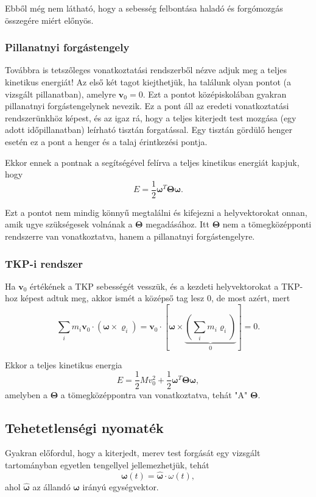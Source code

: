 \documentclass[12pt,a4paper]{scrartcl}
\let\mathbf\bm
\begin{document}
Ebből még nem látható, hogy a sebesség felbontása haladó és forgómozgás összegére miért előnyös.
\subsubsection{Pillanatnyi forgástengely}
Továbbra is tetszőleges vonatkoztatási rendszerből nézve adjuk meg a teljes kinetikus energiát! Az első két tagot kiejthetjük, ha találunk olyan pontot (a vizsgált pillanatban), amelyre ${{\mathbf{v}}_0} = 0$. Ezt a pontot középiskolában gyakran pillanatnyi forgástengelynek nevezik. Ez a pont áll az eredeti vonatkoztatási rendszerünkhöz képest, és az igaz rá, hogy a teljes kiterjedt test mozgása (egy adott időpillanatban) leírható tisztán forgatással. Egy tisztán gördülő henger esetén ez a pont a henger és a talaj érintkezési pontja.

Ekkor ennek a pontnak a segítségével felírva a teljes kinetikus energiát kapjuk, hogy
\[E = \frac{1}{2}{{\mathbf{\omega }}^T}{\mathbf{\Theta \omega }}.\]

Ezt a pontot nem mindig könnyű megtalálni és kifejezni a helyvektorokat onnan, amik ugye szükségesek volnának a ${\mathbf{\Theta }}$ megadásához. Itt ${\mathbf{\Theta }}$ nem a tömegközépponti rendszerre van vonatkoztatva, hanem a pillanatnyi forgástengelyre.

\subsubsection{TKP-i rendszer}
Ha ${{\mathbf{v}}_0}$ értékének a TKP sebességét vesszük, és a kezdeti helyvektorokat a TKP-hoz képest adtuk meg, akkor ismét a középső tag lesz 0, de most azért, mert
\[\sum\limits_i {{m_i}{{\mathbf{v}}_0} \cdot \left( {{\mathbf{\omega }} \times {{\mathbf{\varrho }}_i}} \right)}  = {{\mathbf{v}}_0} \cdot \left[ {{\mathbf{\omega }} \times \underbrace {\left( {\sum\limits_i {{m_i}{{\mathbf{\varrho }}_i}} } \right)}_0} \right] = 0.\]

Ekkor a teljes kinetikus energia
\[E = \frac{1}{2}Mv_0^2 + \frac{1}{2}{{\mathbf{\omega }}^T}{\mathbf{\Theta \omega }},\]
amelyben a ${\mathbf{\Theta }}$ a tömegközéppontra van vonatkoztatva, tehát "A" ${\mathbf{\Theta }}$.

\subsection{Tehetetlenségi nyomaték}
Gyakran előfordul, hogy a kiterjedt, merev test forgását egy vizsgált tartományban egyetlen tengellyel jellemezhetjük, tehát 
\[{\mathbf{\omega }}\left( t \right) = {\mathbf{\hat \omega }} \cdot \omega \left( t \right),\]
ahol ${\mathbf{\hat \omega }}$ az állandó ${\mathbf{\omega }}$ irányú egységvektor.
\end{document}

